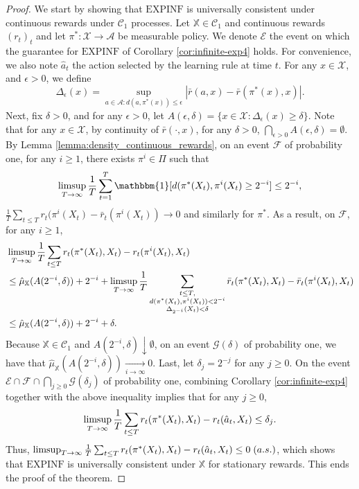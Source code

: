 \documentclass[aos]{imsart}
\theoremstyle{plain}
\theoremstyle{remark}
\newcommand{\Acal}{\mathcal{A}}
\newcommand{\Ccal}{\mathcal{C}}
\newcommand{\Ecal}{\mathcal{E}}
\newcommand{\Fcal}{\mathcal{F}}
\newcommand{\Gcal}{\mathcal{G}}
\newcommand{\Xcal}{\mathcal{X}}
\newcommand{\Xbb}{\mathbb{X}}
\newcommand{\1}{\mathbbm{1}}%
\newcommand{\EXPINF}{\mathrm{EXPINF}}
\renewcommand{\limsup}{\mathop{\rm limsup}}
\begin{document}
\begin{proof}
We start by showing that $\EXPINF$ is universally consistent under continuous rewards under $\Ccal_1$ processes. Let $\Xbb\in\Ccal_1$ and continuous rewards $(r_t)_t$ and let $\pi^*:\Xcal\to\Acal$ be measurable policy. We denote $\Ecal$ the event on which the guarantee for $\EXPINF$ of Corollary \ref{cor:infinite-exp4} holds. For convenience, we also note $\hat a_t$ the action selected by the learning rule at time $t$. For any $x\in\Xcal$, and $\epsilon>0$, we define
\begin{equation*}
    \Delta_\epsilon(x) = \sup_{a\in\Acal: d(a,\pi^*(x))\leq \epsilon} |\bar r(a, x)- \bar r(\pi^*(x), x)|.
\end{equation*}
Next, fix $\delta>0$, and for any $\epsilon>0$, let $A(\epsilon,\delta) = \{x\in\Xcal: \Delta_\epsilon(x) \geq \delta\}.$ Note that for any $x\in\Xcal$, by continuity of $\bar r(\cdot, x)$, for any $\delta>0$, $\bigcap_{\epsilon>0} A(\epsilon,\delta)=\emptyset$. By Lemma \ref{lemma:density_continuous_rewards}, on an event $\Fcal$ of probability one, for any $i\geq 1$, there exists $\pi^i\in\Pi$ such that
\begin{equation*}
    \limsup_{T\to\infty}\frac{1}{T}\sum_{t=1}^T\1[d(\pi^*(X_t),\pi^i(X_t)\geq 2^{-i}] \leq 2^{-i},
\end{equation*}
$\frac{1}{T}\sum_{t\leq T} r_t(\pi^i(X_t)-\bar r_t(\pi^i(X_t))\to 0$ and similarly for $\pi^*$. As a result, on $\Fcal$, for any $i\geq 1$,
\begin{align*}
    &\limsup_{T\to\infty}\frac{1}{T} \sum_{t\leq T}  r_t(\pi^*(X_t), X_t)-  r_t(\pi^i(X_t), X_t)\\
    &\leq \hat \mu_{\Xbb}(A(2^{-i},\delta)) + 2^{-i} + \limsup_{T\to\infty}\frac{1}{T} \sum_{\substack{t\leq T,\\d(\pi^*(X_t),\pi^i(X_t))<2^{-i}\\
    \Delta_{2^{-i}}(X_t)<\delta}} \bar r_t(\pi^*(X_t), X_t)- \bar r_t(\pi^i(X_t), X_t)\\
    &\leq \hat \mu_{\Xbb}(A(2^{-i},\delta)) + 2^{-i} + \delta.
\end{align*}
Because $\Xbb\in\Ccal_1$ and $A(2^{-i},\delta)\downarrow\emptyset$, on an event $\Gcal(\delta)$ of probability one, we have that $\hat \mu_{\Xbb}(A(2^{-i},\delta)) \underset{i\to\infty}{\longrightarrow} 0$. Last, let $\delta_j=2^{-j}$ for any $j\geq 0$. On the event $\Ecal\cap\Fcal\cap\bigcap_{j\geq 0}\Gcal(\delta_j)$ of probability one, combining Corollary \ref{cor:infinite-exp4} together with the above inequality implies that for any $j\geq 0$,
\begin{equation*}
    \limsup_{T\to\infty}\frac{1}{T} \sum_{t\leq T}  r_t(\pi^*(X_t), X_t)-  r_t(\hat a_t, X_t) \leq \delta_j.
\end{equation*}
Thus, $\limsup_{T\to\infty}\frac{1}{T} \sum_{t\leq T}  r_t(\pi^*(X_t), X_t)-  r_t(\hat a_t, X_t)\leq 0\;(a.s.)$, which shows that $\EXPINF$ is universally consistent under $\Xbb$ for stationary rewards. This ends the proof of the theorem.


\end{proof}
\end{document}
